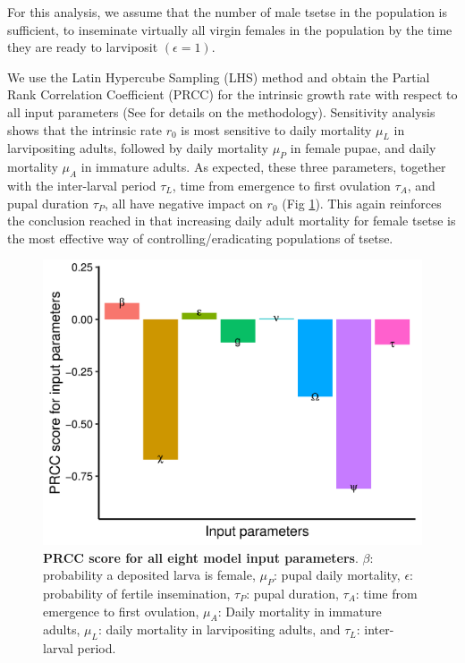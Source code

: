 \documentclass[12pt,a4paper]{article}
\begin{document}
For this analysis, we assume that the number of male tsetse in the population is sufficient, to inseminate virtually all virgin females in the population by the time they are ready to larviposit $(\epsilon = 1)$. 

We use the Latin Hypercube Sampling (LHS) method and obtain the Partial Rank Correlation Coefficient (PRCC) for the intrinsic growth rate with respect to all input parameters (See \cite{are2019weakest} for details on the methodology).  Sensitivity analysis shows that the intrinsic rate $r_0$ is most sensitive to daily mortality $\mu_L$ in larvipositing adults, followed by daily mortality $\mu_P$ in female pupae, and daily mortality $\mu_A$ in immature adults. As expected, these three parameters, together with the inter-larval period $\tau_L$, time from emergence to first ovulation $\tau_A$, and pupal duration $\tau_P$, all have negative impact on $r_0$ (Fig \ref{fig:SensitivityPlot}). This again reinforces the conclusion reached in \cite{are2019weakest} that increasing daily adult mortality for female tsetse is the most effective way of controlling/eradicating populations of tsetse.  

\begin{figure}[hbt!]
	\centering
	\includegraphics[width=0.7\linewidth]{GrowthRateSensitivityPlot}
	\caption{{\bf PRCC score for all eight model input parameters}. $\beta$: probability a deposited larva is female, $\mu_P$: pupal daily mortality, $\epsilon$: probability of fertile insemination, $\tau_P$: pupal duration, $\tau_A$: time from emergence to first ovulation, $\mu_A$: Daily mortality in immature adults, $\mu_L$: daily mortality in larvipositing adults, and $\tau_L$: inter-larval period.}
	\label{fig:SensitivityPlot}
\end{figure}
\end{document}
